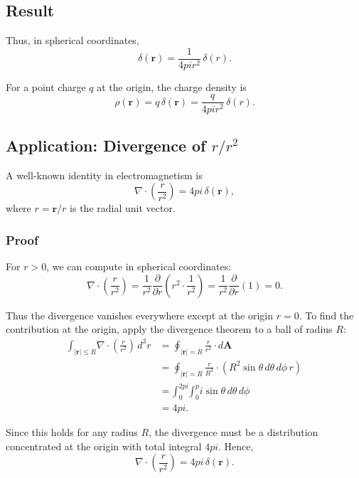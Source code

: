 \documentclass{article}
\def\pi{pi}%
\def\hat#1{#1}%
\def\int{\text{∫}}%
\begin{document}
\subsection*{Result}
Thus, in spherical coordinates,
\begin{equation}
\boxed{ \delta(\mathbf{r}) = \frac{1}{4\pi r^2}\,\delta(r) }.
\end{equation}

For a point charge $q$ at the origin, the charge density is
\begin{equation}
\rho(\mathbf{r}) = q \, \delta(\mathbf{r}) 
= \frac{q}{4\pi r^2}\,\delta(r).
\end{equation}
\subsection*{Application: Divergence of $\hat{r}/r^2$}

A well-known identity in electromagnetism is
\begin{equation}
\nabla \cdot \left( \frac{\hat{r}}{r^2} \right) = 4\pi \, \delta(\mathbf{r}),
\end{equation}
where $\hat{r} = \mathbf{r}/r$ is the radial unit vector.

\subsubsection*{Proof}
For $r > 0$, we can compute in spherical coordinates:
\begin{equation}
\nabla \cdot \left( \frac{\hat{r}}{r^2} \right)
= \frac{1}{r^2} \frac{\partial}{\partial r} \left( r^2 \cdot \frac{1}{r^2} \right)
= \frac{1}{r^2} \frac{\partial}{\partial r}(1) = 0.
\end{equation}

Thus the divergence vanishes everywhere except at the origin $r=0$.  
To find the contribution at the origin, apply the divergence theorem to a ball of radius $R$:
\begin{align}
\int_{|\mathbf{r}|\leq R} \nabla \cdot \left( \frac{\hat{r}}{r^2} \right) \, d^3r
&= \oint_{|\mathbf{r}|=R} \frac{\hat{r}}{r^2} \cdot d\mathbf{A} \\
&= \oint_{|\mathbf{r}|=R} \frac{\hat{r}}{R^2} \cdot (R^2 \sin\theta \, d\theta \, d\phi \, \hat{r}) \\
&= \int_0^{2\pi} \int_0^\pi \sin\theta \, d\theta \, d\phi \\
&= 4\pi.
\end{align}

Since this holds for any radius $R$, the divergence must be a distribution concentrated at the origin with total integral $4\pi$.  
Hence,
\begin{equation}
\nabla \cdot \left( \frac{\hat{r}}{r^2} \right) = 4\pi \, \delta(\mathbf{r}).
\end{equation}
\end{document}
